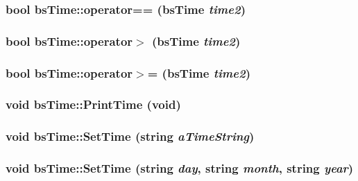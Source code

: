 \label{classbs_time_ab76bf8c42eef5e941421b502783784ea}
\hypertarget{classbs_time_a885013e543021095601d1377ade2cbf1}{
\subsubsection[{operator==}]{\setlength{\rightskip}{0pt plus 5cm}bool bsTime::operator== ({\bf bsTime} {\em time2})}}
\label{classbs_time_a885013e543021095601d1377ade2cbf1}
\hypertarget{classbs_time_aedb84a09d0c644f4bf9a28048a61bc24}{
\subsubsection[{operator$>$}]{\setlength{\rightskip}{0pt plus 5cm}bool bsTime::operator$>$ ({\bf bsTime} {\em time2})}}
\label{classbs_time_aedb84a09d0c644f4bf9a28048a61bc24}
\hypertarget{classbs_time_ada715fa122c755bbce087557bcb85dfb}{
\subsubsection[{operator$>$=}]{\setlength{\rightskip}{0pt plus 5cm}bool bsTime::operator$>$= ({\bf bsTime} {\em time2})}}
\label{classbs_time_ada715fa122c755bbce087557bcb85dfb}
\hypertarget{classbs_time_a0606f87b994fa794e1241c3c0765e571}{
\subsubsection[{PrintTime}]{\setlength{\rightskip}{0pt plus 5cm}void bsTime::PrintTime (void)}}
\label{classbs_time_a0606f87b994fa794e1241c3c0765e571}
\hypertarget{classbs_time_a88b9242a6a5369bee46e2e3f828db1cc}{
\subsubsection[{SetTime}]{\setlength{\rightskip}{0pt plus 5cm}void bsTime::SetTime (string {\em aTimeString})}}
\label{classbs_time_a88b9242a6a5369bee46e2e3f828db1cc}
\hypertarget{classbs_time_ac182063c47984a4f6cfd9461c0e86f2e}{
\subsubsection[{SetTime}]{\setlength{\rightskip}{0pt plus 5cm}void bsTime::SetTime (string {\em day}, \/  string {\em month}, \/  string {\em year})}}
